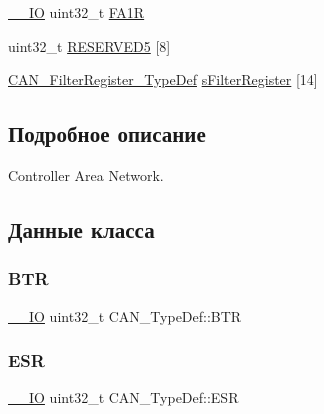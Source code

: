 \begin{DoxyCompactItemize}
\item 
\mbox{\hyperlink{group___c_m_s_i_s___c_m3__core__definitions_gaec43007d9998a0a0e01faede4133d6be}{\+\_\+\+\_\+\+IO}} uint32\+\_\+t \mbox{\hyperlink{struct_c_a_n___type_def_ab57a3a6c337a8c6c7cb39d0cefc2459a}{F\+A1R}}
\item 
uint32\+\_\+t \mbox{\hyperlink{struct_c_a_n___type_def_ad4339975b6064cfe2aaeb642f916d6e0}{R\+E\+S\+E\+R\+V\+E\+D5}} \mbox{[}8\mbox{]}
\item 
\mbox{\hyperlink{struct_c_a_n___filter_register___type_def}{C\+A\+N\+\_\+\+Filter\+Register\+\_\+\+Type\+Def}} \mbox{\hyperlink{struct_c_a_n___type_def_ab8ad52d839d4bcea4ce3502a4d279ff1}{s\+Filter\+Register}} \mbox{[}14\mbox{]}
\end{DoxyCompactItemize}


\subsection{Подробное описание}
Controller Area Network. 

\subsection{Данные класса}
\mbox{\label{struct_c_a_n___type_def_accad1e4155459a13369f5ad0e7c6da29}} 
\subsubsection{\texorpdfstring{BTR}{BTR}}
{\footnotesize\ttfamily \mbox{\hyperlink{group___c_m_s_i_s___c_m3__core__definitions_gaec43007d9998a0a0e01faede4133d6be}{\+\_\+\+\_\+\+IO}} uint32\+\_\+t C\+A\+N\+\_\+\+Type\+Def\+::\+B\+TR}

\mbox{\label{struct_c_a_n___type_def_ab1a1b6a7c587443a03d654d3b9a94423}} 
\subsubsection{\texorpdfstring{ESR}{ESR}}
{\footnotesize\ttfamily \mbox{\hyperlink{group___c_m_s_i_s___c_m3__core__definitions_gaec43007d9998a0a0e01faede4133d6be}{\+\_\+\+\_\+\+IO}} uint32\+\_\+t C\+A\+N\+\_\+\+Type\+Def\+::\+E\+SR}

